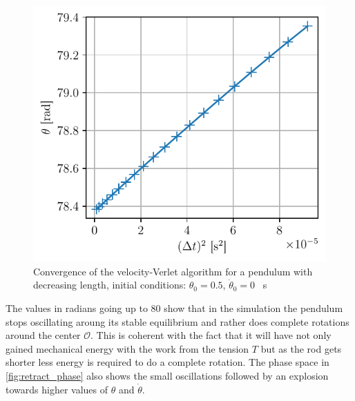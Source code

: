 \begin{figure}
    \centering
    \includegraphics[width=\linewidth]{figures/converg_retraction.pdf}
    \caption{Convergence of the velocity-Verlet algorithm for a pendulum with decreasing length, initial conditions: $\theta_0 = 0.5$, $\dot{\theta}_0 = 0$ \si{\per\second}}
    \label{fig:conv_retract}
\end{figure}
The values in radians going up to 80 show that in the simulation the pendulum stops oscillating aroung its stable equilibrium and rather does complete rotations around the center $\mathcal{O}$. This is coherent with the fact that it will have not only gained mechanical energy with the work from the tension $T$ but as the rod gets shorter less energy is required to do a complete rotation. The phase space in \autoref{fig:retract_phase} also shows the small oscillations followed by an explosion towards higher values of $\theta$ and $\dot\theta$.

